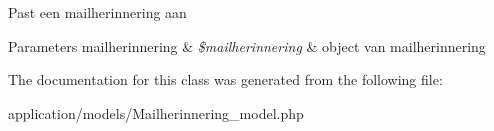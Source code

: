 Past een mailherinnering aan 
\begin{DoxyParams}[1]{Parameters}
mailherinnering & {\em \$mailherinnering} & object van mailherinnering \\
\hline
\end{DoxyParams}


The documentation for this class was generated from the following file\+:\begin{DoxyCompactItemize}
\item 
application/models/Mailherinnering\+\_\+model.\+php\end{DoxyCompactItemize}
